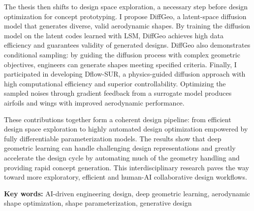 The thesis then shifts to design space exploration, a necessary step before design optimization for concept prototyping. I propose DiffGeo, a latent-space diffusion model that generates diverse, valid aerodynamic shapes. By training the diffusion model on the latent codes learned with LSM, DiffGeo achieves high data efficiency and guarantees validity of generated designs. DiffGeo also demonstrates conditional sampling: by guiding the diffusion process with complex geometric objectives, engineers can generate shapes meeting specified criteria. Finally, I participated in developing Dflow-SUR, a physics-guided diffusion approach with high computational efficiency and superior controllability. Optimizing the sampled noises through gradient feedback from a surrogate model produces airfoils and wings with improved aerodynamic performance.

These contributions together form a coherent design pipeline: from efficient design space exploration to highly automated design optimization empowered by fully differentiable parameterization models. The results show that deep geometric learning can handle challenging design representations and greatly accelerate the design cycle by automating much of the geometry handling and providing rapid concept generation. This interdisciplinary research paves the way toward more exploratory, efficient and human-AI collaborative design workflows.

\textbf{Key words:} AI-driven engineering design, deep geometric learning, aerodynamic shape optimization, shape parameterization, generative design

